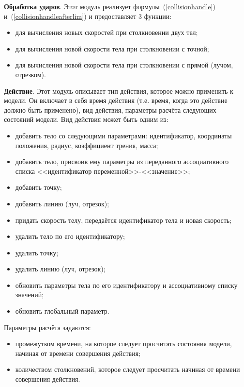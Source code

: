 \textbf{Обработка ударов}.\label{collisionhandledescr}
Этот модуль реализует формулы~(\ref{collisionhandle}) и~(\ref{collisionhandleafterlim}) и
предоставляет 3 функции:

\begin{itemize}
    \item для вычисления новых скоростей при столкновении двух тел;
    \item для вычисления новой скорости тела при столкновении с точной;
    \item для вычисления новой скорости тела при столкновении с прямой (лучом, отрезком).
\end{itemize}

\textbf{Действие}.\label{actiondescr}
Этот модуль описывает тип действия, которое можно применить к модели.
Он включает в себя время действия (т.е. время, когда это действие должно быть применено), вид действия,
параметры расчёта следующих состояний модели. Вид действия может быть одним из:

\begin{itemize}
    \item добавить тело со следующими параметрами: идентификатор, координаты положения, радиус, коэффициент трения, масса;
    \item добавить тело, присвоив ему параметры из переданного ассоциативного списка <<идентификатор переменной>>-<<значение>>;
    \item добавить точку;
    \item добавить линию (луч, отрезок);
    \item придать скорость телу, передаётся идентификатор тела и новая скорость;
    \item удалить тело по его идентификатору;
    \item удалить точку;
    \item удалить линию (луч, отрезок);
    \item обновить параметры тела по его идентификатору и ассоциативному списку значений;
    \item обновить глобальный параметр.
\end{itemize}

Параметры расчёта задаются:

\begin{itemize}
    \item промежутком времени, на которое следует просчитать состояния модели, начиная от времени совершения действия;
    \item количеством столкновений, которое следует просчитать начиная от времени совершения действия.
\end{itemize}

